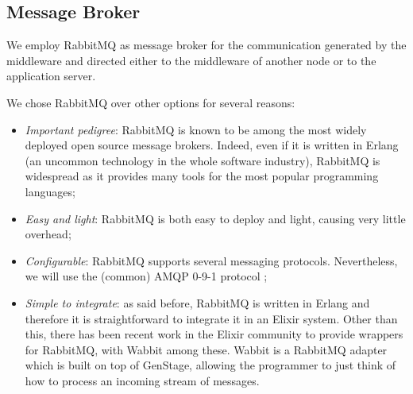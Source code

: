 \subsection{Message Broker}
We employ RabbitMQ as message broker
for the communication generated by the middleware and directed either to
the middleware of another node or to the application server.

We chose RabbitMQ over other options for several reasons:
\begin{itemize}
  \item \textit{Important pedigree}: RabbitMQ is known to be among the
        most widely deployed open source message brokers. Indeed, even if it
        is written in Erlang (an uncommon technology in
        the whole software industry), RabbitMQ is widespread as it provides
        many tools for the most popular programming languages;
  \item \textit{Easy and light}: RabbitMQ is both easy to deploy and light,
    causing very little overhead;
  \item \textit{Configurable}: RabbitMQ supports several messaging protocols.
        Nevertheless, we will use the (common) AMQP 0-9-1 protocol
        \cite{vinoski2006advanced};
  \item \textit{Simple to integrate}: as said before, RabbitMQ is written in
        Erlang and therefore it is straightforward to integrate it in an Elixir
        system.
        Other than this, there has been recent work in the Elixir community to
        provide wrappers for RabbitMQ, with Wabbit among these. Wabbit
        is a RabbitMQ adapter which is built on top of GenStage, allowing the
        programmer to just think of how to process an incoming stream of
        messages.
\end{itemize}
